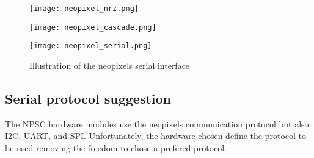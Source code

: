 \begin{figure}[h!]
\centering
\begin{minipage}[b]{0.45\textwidth}
\texttt{[image: neopixel\_nrz.png]}
\label{fig:neopixel_nrz}
\end{minipage}
\begin{minipage}[b]{0.45\textwidth}
\texttt{[image: neopixel\_cascade.png]}
\label{fig:neopixel_cascade}
\end{minipage}
\begin{minipage}[b]{\textwidth}
\texttt{[image: neopixel\_serial.png]}
\label{fig:neopixel_serial}
\end{minipage}
\caption{Illustration of the neopixels serial interface}
\label{fig:neopixel_protocol}
\end{figure}
 
\subsection{Serial protocol suggestion}
The NPSC hardware modules use the neopixels communication protocol but also I2C, UART, and SPI. Unfortunately, the hardware chosen define the protocol to be used removing the freedom to chose a prefered protocol.
